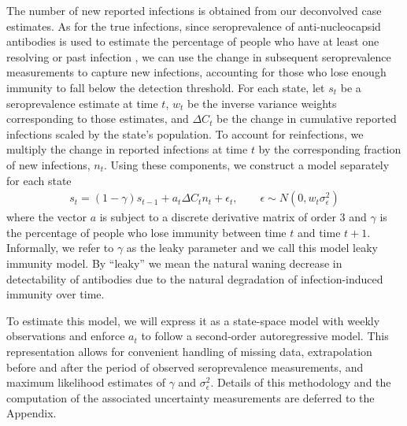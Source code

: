\documentclass{article}
\begin{document}
The number of new reported infections is obtained from our
deconvolved case estimates. As for the true
infections, since seroprevalence of anti-nucleocapsid antibodies is used to
estimate the percentage of people who have at least one resolving or past
infection \citep{cdc2020data}, we can use
the change in subsequent seroprevalence measurements to capture new infections, 
accounting for those who lose enough immunity to fall below the detection threshold.
For each state, let $s_t$ be a seroprevalence estimate at time $t$, $w_t$ be the
inverse variance weights corresponding to those estimates, and $\Delta C_t$ be
the change in cumulative reported infections scaled by the state's population.
To account for reinfections, we multiply the change in reported infections at
time $t$ by the corresponding fraction of new infections, $n_t$. Using these
components, we construct a model separately for each state
\begin{align}
s_t = (1 -\gamma)s_{t-1} + a_t\Delta C_t n_t + \epsilon_t, \qquad \epsilon \sim N(0, w_t\sigma^2_\epsilon) \label{eq:leakypr}
\end{align}
where the vector $a$ is subject to a discrete derivative matrix of order $3$ 
and $\gamma$ is the percentage
of people who lose immunity between time $t$ and time $t+1$.
Informally, we refer to $\gamma$ as the leaky parameter and we call this model leaky 
immunity model. By ``leaky'' we mean the natural waning decrease in detectability of antibodies 
due to the natural degradation of infection-induced
immunity over time. 

To estimate this
model, we will express it as a state-space model with weekly observations and
enforce $a_t$ to follow a second-order autoregressive model. This representation
allows for convenient handling of missing data, extrapolation before and after
the period of observed seroprevalence measurements, and maximum likelihood
estimates of $\gamma$ and $\sigma^2_\epsilon$. Details of this methodology and
the computation of the associated uncertainty measurements are deferred to the
Appendix. 
\end{document}
